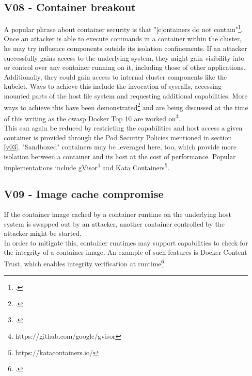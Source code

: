 \subsection{V08 - Container breakout} \label{v08}
A popular phrase about container security is that "[c]ontainers do not contain"\footcite[][, first headline]{doNotContain}.
Once an attacker is able to execute commands in a container within the cluster, he may try influence components outside its isolation confinements. 
If an attacker successfully gains access to the underlying system, they might gain visibility into or control over any container running on it, including those of other applications. Additionally, they could gain access to internal cluster components like the kubelet.
Ways to achieve this include the invocation of syscalls, accessing mounted parts of the host file system and requesting additional capabilities. More ways to achieve this  have been demonstrated\footcite[][, section 'Breaking down the proof of concept']{trailOfBitsEscape} and are being discussed at the time of this writing as the \gls{owasp} Docker Top 10 are worked on\footcite[][, dialogue by GitHub users 'drwetter', 'gramsimamsi' and 'wurstbrot']{dockerTop10GithubIssue}. \\
\newpage
This can again be reduced by restricting the capabilities and host access a given container is provided through the Pod Security Policies mentioned in section \ref{v03}.
"Sandboxed" containers may be leveraged here, too, which provide more isolation between a container and its host at the cost of performance. Popular implementations include gVisor\footnote{https://github.com/google/gvisor} and Kata Containers\footnote{https://katacontainers.io/}.

\subsection{V09 - Image cache compromise}
If the container image cached by a container runtime on the underlying host system is swapped out by an attacker, another container controlled by the attacker might be started. \\
In order to mitigate this, container runtimes may support capabilities to check for the integrity of a container image. An example of such features is Docker Content Trust, which enables integrity verification at runtime\footcite[][, section 'About Docker Content Trust (DCT)']{dockerContentTrust}.

